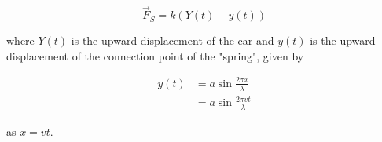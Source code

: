 \documentclass[12pt]{article}
\begin{document}
\begin{enumerate}
        \begin{equation}
            \vec{F}_S = k(Y(t) - y(t))
        \end{equation}

        \noindent
        where $Y(t)$ is the upward displacement of the car and $y(t)$ is the upward displacement 
        of the connection point of the "spring", given by 

        \begin{equation}
            \begin{split}
                y(t) &= a\sin\frac{2\pi x}{\lambda} \\
                &= a\sin\frac{2\pi v t}{\lambda}
            \end{split}
        \end{equation}

        \noindent
        as $x = vt$.
    \end{enumerate}
\end{document}
